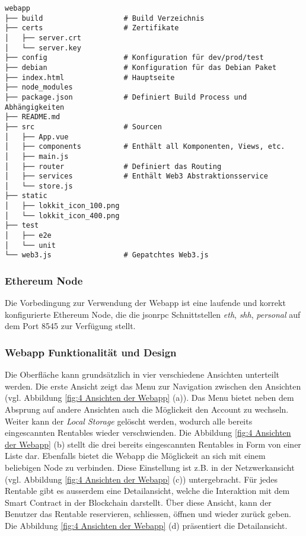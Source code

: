 \begin{minipage}{\textwidth}
\begin{lstlisting}[style=tree,caption={Projektstruktur der Webapp}]
webapp
├── build                   # Build Verzeichnis
├── certs                   # Zertifikate
│   ├── server.crt
│   └── server.key
├── config                  # Konfiguration für dev/prod/test
├── debian                  # Konfiguration für das Debian Paket
├── index.html              # Hauptseite
├── node_modules            
├── package.json            # Definiert Build Process und Abhängigkeiten
├── README.md               
├── src                     # Sourcen
│   ├── App.vue
│   ├── components          # Enthält all Komponenten, Views, etc.
│   ├── main.js
│   ├── router              # Definiert das Routing
│   ├── services            # Enthält Web3 Abstraktionsservice
│   └── store.js            
├── static
│   ├── lokkit_icon_100.png
│   └── lokkit_icon_400.png
├── test                     
│   ├── e2e
│   └── unit
└── web3.js                 # Gepatchtes Web3.js
\end{lstlisting}
\end{minipage}

\subsubsection{Ethereum Node}
Die Vorbedingung zur Verwendung der Webapp ist eine laufende und korrekt konfigurierte Ethereum Node, die die jsonrpc Schnittstellen \emph{eth}, \emph{shh}, \emph{personal} auf dem Port 8545 zur Verfügung stellt.


\subsubsection{Webapp Funktionalität und Design}
Die Oberfläche kann grundsätzlich in vier verschiedene Ansichten unterteilt werden. Die erste Ansicht zeigt das Menu zur Navigation zwischen den Ansichten (vgl. Abbildung \ref{fig:4 Ansichten der Webapp} (a)). Das Menu bietet neben dem Absprung auf andere Ansichten auch die Möglickeit den Account zu wechseln. Weiter kann der \emph{Local Storage} gelöscht werden, wodurch alle bereits eingescannten Rentables wieder verschwienden. Die Abbildung \ref{fig:4 Ansichten der Webapp} (b) stellt die drei bereits eingescannten Rentables in Form von einer Liste dar. 
Ebenfalls bietet die Webapp die Möglickeit an sich mit einem beliebigen Node zu verbinden. Diese Einstellung ist z.B. in der Netzwerkansicht (vgl. Abbildung \ref{fig:4 Ansichten der Webapp} (c)) untergebracht. Für jedes Rentable gibt es ausserdem eine Detailansicht, welche die Interaktion mit dem Smart Contract in der Blockchain darstellt. Über diese Ansicht, kann der Benutzer das Rentable reservieren, schliessen, öffnen und wieder zurück geben. Die Abbildung \ref{fig:4 Ansichten der Webapp} (d) präsentiert die Detailansicht.

